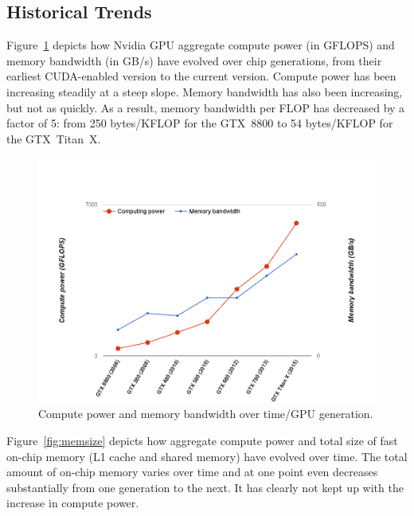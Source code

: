 \subsection{Historical Trends}  \label{GPUArchTrends}

Figure~\ref{fig:compute-power} depicts how Nvidia GPU aggregate compute power (in GFLOPS) and memory
bandwidth (in GB/s) have evolved over chip generations, from their earliest CUDA-enabled version to the current
version.
Compute power has been increasing steadily at a steep slope.
Memory bandwidth has also been increasing, but not as quickly.
As a result, memory bandwidth per FLOP has decreased by a factor of 5: from 250 bytes/KFLOP for the GTX~8800 to
54 bytes/KFLOP for the GTX~Titan~X.

\begin{figure}[ht]
\center
\includegraphics[scale=0.26]{computevsmemory.png}
\caption{\footnotesize\textnormal{Compute power and memory bandwidth over time/GPU generation.}}
\label{fig:compute-power}
\vspace{-0.4cm}
\end{figure}

Figure~\ref{fig:memsize} depicts how aggregate compute power and total size of fast on-chip memory (L1 cache and shared memory) have evolved over time.
The total amount of on-chip memory varies over time and at one point even decreases substantially from one generation to the next.
It has clearly not kept up with the increase in compute power. 


